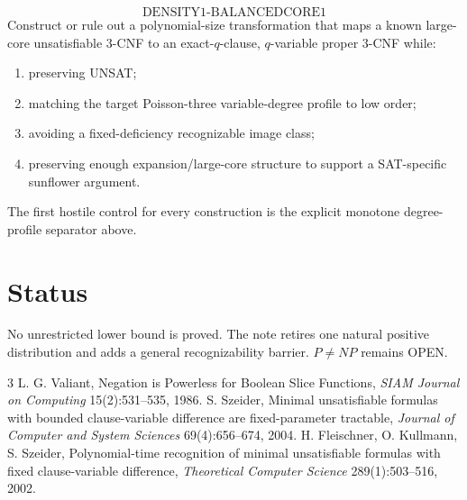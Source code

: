 \documentclass[11pt]{article}
\begin{document}
\[
\boxed{\text{DENSITY1-BALANCEDCORE1}}
\]
Construct or rule out a polynomial-size transformation that maps a known large-core unsatisfiable 3-CNF to an exact-\(q\)-clause, \(q\)-variable proper 3-CNF while:
\begin{enumerate}
\item preserving UNSAT;
\item matching the target Poisson-three variable-degree profile to low order;
\item avoiding a fixed-deficiency recognizable image class;
\item preserving enough expansion/large-core structure to support a SAT-specific sunflower argument.
\end{enumerate}

The first hostile control for every construction is the explicit monotone degree-profile separator above.

\section{Status}
No unrestricted lower bound is proved. The note retires one natural positive distribution and adds a general recognizability barrier. \(P\ne NP\) remains OPEN.

\begin{thebibliography}{3}
L. G. Valiant, Negation is Powerless for Boolean Slice Functions, \emph{SIAM Journal on Computing} 15(2):531--535, 1986.
S. Szeider, Minimal unsatisfiable formulas with bounded clause-variable difference are fixed-parameter tractable, \emph{Journal of Computer and System Sciences} 69(4):656--674, 2004.
H. Fleischner, O. Kullmann, S. Szeider, Polynomial-time recognition of minimal unsatisfiable formulas with fixed clause-variable difference, \emph{Theoretical Computer Science} 289(1):503--516, 2002.
\end{thebibliography}
\end{document}
